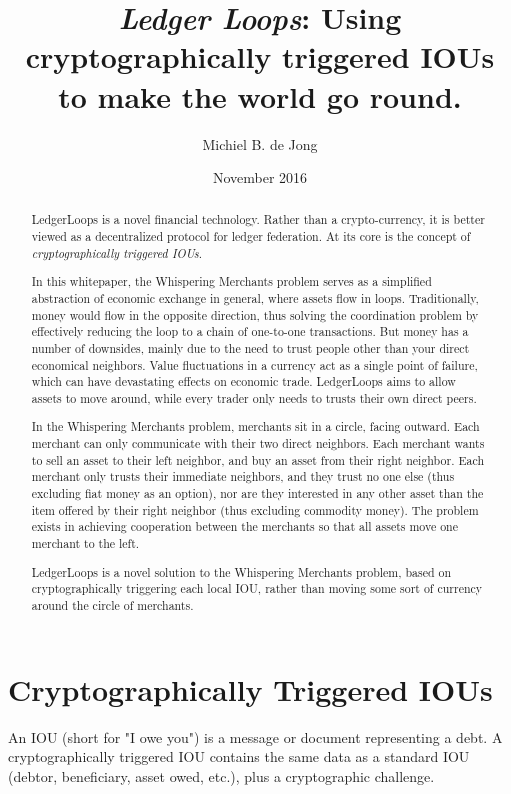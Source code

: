 \documentclass[11pt,twoside,a4paper]{article}
\begin{document}
\title{{\em Ledger Loops}: Using cryptographically triggered IOUs to make the world go round.}
\author{Michiel B. de Jong}
\date{November 2016}
\maketitle
\begin{abstract}
LedgerLoops is a novel financial technology. Rather than a crypto-currency, it is better viewed as a decentralized protocol for ledger federation. At its core is the concept of {\em cryptographically triggered IOUs}.

In this whitepaper, the Whispering Merchants problem serves as a simplified abstraction of economic exchange in general, where assets flow in loops. Traditionally, money would flow in the opposite direction, thus solving the coordination problem by effectively reducing the loop to a chain of one-to-one transactions. But money has a number of downsides, mainly due to the need to trust people other than your direct economical neighbors. Value fluctuations in a currency act as a single point of failure, which can have devastating effects on economic trade. LedgerLoops aims to allow assets to move around, while every trader only needs to trusts their own direct peers.

In the Whispering Merchants problem, merchants sit in a circle, facing outward. Each merchant can only communicate with their two direct neighbors. Each merchant wants to sell an asset to their left neighbor, and buy an asset from their right neighbor. Each merchant only trusts their immediate neighbors, and they trust no one else (thus excluding fiat money as an option), nor are they interested in any other asset than the item offered by their right neighbor (thus excluding commodity money). The problem exists in achieving cooperation between the merchants so that all assets move one merchant to the left.

LedgerLoops is a novel solution to the Whispering Merchants problem, based on cryptographically triggering each local IOU, rather than moving some sort of currency around the circle of merchants.
\end{abstract}
\section{Cryptographically Triggered IOUs}
An IOU (short for "I owe you") is a message or document representing a debt.
A cryptographically triggered IOU contains the same data as a standard IOU (debtor, beneficiary, asset owed, etc.), plus a cryptographic challenge.
\end{document}
